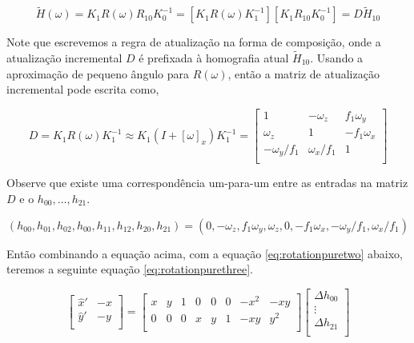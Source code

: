 \documentclass{article}
\begin{document}
\begin{equation}
\tilde{H}(\omega) = K_1R(\omega)R_{10}K^{-1}_0 = [K_1R(\omega)K^{-1}_1][K_1R_{10}K^{-1}_0] = D\tilde{H}_{10}
\end{equation}

Note que escrevemos a regra de atualização na forma de composição, onde a atualização incremental $D$ é prefixada à homografia atual $\tilde{H}_{10}$. Usando a aproximação de pequeno ângulo para $R(\omega)$, então a matriz de atualização incremental pode escrita como,

\begin{equation}
D =  K_1R(\omega)K^{-1}_1 \approx K_1(I +[\omega]_{x}) K^{-1}_1=
\begin{bmatrix}
1 & -\omega_{z} & f_{1}\omega_{y}\\
\omega_{z} & 1 & -f_{1}\omega_{x}\\
-\omega_{y}/f_1 & \omega_{x}/f_1 & 1\\
\end{bmatrix}
\end{equation}

Observe que existe uma correspondência um-para-um entre as entradas na matriz $D$ e o $h_{00}, \dots, h_{21}$.

\begin{equation}
(h_{00}, h_{01}, h_{02}, h_{00}, h_{11}, h_{12}, h_{20}, h_{21}) = (0, -\omega_{z}, f_{1}\omega_{y}, \omega_{z}, 0, -f_{1}\omega_{x}, -\omega_{y}/f_1, \omega_{x}/f_{1})
\end{equation}

Então combinando a equação acima, com a equação \ref{eq:rotationpuretwo} abaixo, teremos a seguinte equação \ref{eq:rotationpurethree}.

\begin{equation}\label{eq:rotationpuretwo}
\begin{bmatrix}
\hat{x}' &  -x\\
\hat{y}' & -y \\
\end{bmatrix}=
\begin{bmatrix}
x &  y & 1 & 0 & 0 & 0 & -x^{2} & -xy\\
0 & 0 & 0 & x & y & 1 & -xy & y^{2} \\
\end{bmatrix}
\begin{bmatrix}
\Delta h_{00}\\
\vdots\\
\Delta h_{21}\\
\end{bmatrix}
\end{equation}
\end{document}
